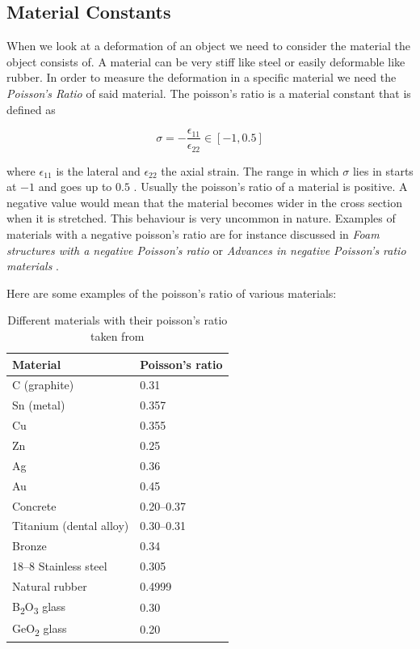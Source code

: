 \subsection{Material Constants}
When we look at a deformation of an object we need to consider the material the object consists of. A material can be very stiff like steel or easily deformable like rubber. In order to measure the deformation in a specific material we need the \textit{Poisson's Ratio} of said material. The poisson's ratio is a material constant that is defined as 

\begin{equation}\label{eq:poisson}
\sigma = - \frac{\epsilon_{11}}{\epsilon_{22}} \in [-1, 0.5]
\end{equation}

where $\epsilon_{11}$ is the lateral and $\epsilon_{22}$ the axial strain. The range in which $\sigma$ lies in starts at $-1$ and goes up to $0.5$ \cite{PhysRevB.80.132104}. Usually the poisson's ratio of a material is positive. A negative value would mean that the material becomes wider in the cross section when it is stretched. This behaviour is very uncommon in nature. Examples of materials with a negative poisson's ratio are for instance discussed in \textit{Foam structures with a negative Poisson's ratio} \cite{lakes1987foam} or \textit{Advances in negative Poisson's ratio materials} \cite{lakes1993advances}.

Here are some examples of the poisson's ratio of various materials:

\begin{table}[!htbp]
\centering
    \begin{tabular}{ | l | l |}
    \hline
    \textbf{Material} & \textbf{Poisson's ratio} \\ \hline
    C (graphite) & 0.31 \\ \hline
    Sn (metal) & 0.357 \\ \hline
    Cu & 0.355 \\ \hline
    Zn & 0.25 \\ \hline
    Ag & 0.36 \\ \hline
    Au & 0.45 \\ \hline
    Concrete & 0.20–0.37 \\ \hline
    Titanium (dental alloy) & 0.30–0.31 \\ \hline
    Bronze & 0.34 \\ \hline
    18–8 Stainless steel & 0.305 \\ \hline
    Natural rubber & 0.4999 \\ \hline
	B\textsubscript{2}O\textsubscript{3} glass & 0.30 \\ \hline
	GeO\textsubscript{2} glass & 0.20 \\ \hline	
    \end{tabular}
    \caption{Different materials with their poisson's ratio taken from \cite{PhysRevB.80.132104}}
\label{table:1}
\end{table}

